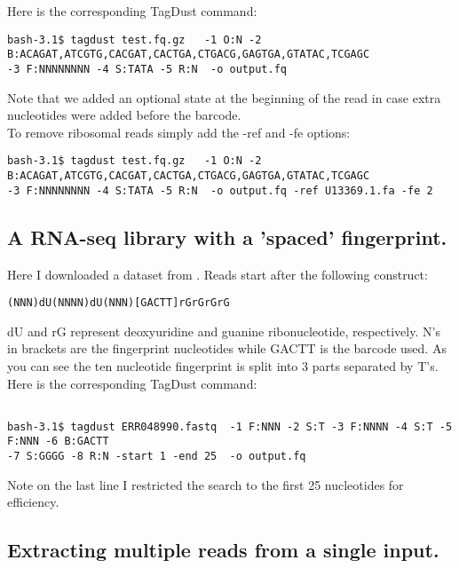 \documentclass[11pt,a4paper,oneside]{book}
\begin{document}
Here is the corresponding TagDust command: 


{\small
\begin{verbatim}
bash-3.1$ tagdust test.fq.gz   -1 O:N -2 B:ACAGAT,ATCGTG,CACGAT,CACTGA,CTGACG,GAGTGA,GTATAC,TCGAGC
-3 F:NNNNNNNN -4 S:TATA -5 R:N  -o output.fq
\end{verbatim}
}

Note that we added an optional state at the beginning of the read in case extra nucleotides were added before the barcode.  \\ 

To remove ribosomal reads simply add the -ref and -fe options:

{\small
\begin{verbatim}
bash-3.1$ tagdust test.fq.gz   -1 O:N -2 B:ACAGAT,ATCGTG,CACGAT,CACTGA,CTGACG,GAGTGA,GTATAC,TCGAGC
-3 F:NNNNNNNN -4 S:TATA -5 R:N  -o output.fq -ref U13369.1.fa -fe 2 
\end{verbatim}
}




\subsection{A RNA-seq library with a 'spaced' fingerprint.}

Here I downloaded a dataset from \cite{Kivioja:2012kg}. Reads start after the following construct:

{
\begin{verbatim}
(NNN)dU(NNNN)dU(NNN)[GACTT]rGrGrGrG
\end{verbatim}
}
dU and rG represent deoxyuridine and guanine ribonucleotide, respectively. N's in brackets are the fingerprint nucleotides while GACTT is the barcode used. As you can see the ten nucleotide fingerprint is split into 3 parts separated by T's. \\

Here is the corresponding TagDust command: 


{\small
\begin{verbatim}

bash-3.1$ tagdust ERR048990.fastq  -1 F:NNN -2 S:T -3 F:NNNN -4 S:T -5 F:NNN -6 B:GACTT
-7 S:GGGG -8 R:N -start 1 -end 25  -o output.fq
\end{verbatim}
}

Note on the last line I restricted the search to the first 25 nucleotides for efficiency. 


\subsection{Extracting multiple reads from a single input.}
\end{document}
